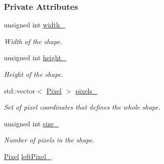 \subsubsection*{Private Attributes}
\begin{CompactItemize}
\item 
\hypertarget{class_shape_863661d529942b525830d2208259583b}{
unsigned int \hyperlink{class_shape_863661d529942b525830d2208259583b}{width\_\-}}
\label{class_shape_863661d529942b525830d2208259583b}

\begin{CompactList}\small\item\em Width of the shape. \item\end{CompactList}\item 
\hypertarget{class_shape_76354eeb3b4c5c6c9125f4195c3c274c}{
unsigned int \hyperlink{class_shape_76354eeb3b4c5c6c9125f4195c3c274c}{height\_\-}}
\label{class_shape_76354eeb3b4c5c6c9125f4195c3c274c}

\begin{CompactList}\small\item\em Height of the shape. \item\end{CompactList}\item 
\hypertarget{class_shape_286ebb0c6010efe288d5e79192e309dc}{
std::vector$<$ \hyperlink{_shape_8hpp_535e59456e3e633842529cfa8ea103c4}{Pixel} $>$ \hyperlink{class_shape_286ebb0c6010efe288d5e79192e309dc}{pixels\_\-}}
\label{class_shape_286ebb0c6010efe288d5e79192e309dc}

\begin{CompactList}\small\item\em Set of pixel coordinates that defines the whole shape. \item\end{CompactList}\item 
\hypertarget{class_shape_adec7080fb17de89d2f6c9d53d4b0283}{
unsigned int \hyperlink{class_shape_adec7080fb17de89d2f6c9d53d4b0283}{size\_\-}}
\label{class_shape_adec7080fb17de89d2f6c9d53d4b0283}

\begin{CompactList}\small\item\em Number of pixels in the shape. \item\end{CompactList}\item 
\hypertarget{class_shape_812cd080959b320038aae54729831ce4}{
\hyperlink{_shape_8hpp_535e59456e3e633842529cfa8ea103c4}{Pixel} \hyperlink{class_shape_812cd080959b320038aae54729831ce4}{leftPixel\_\-}}
\label{class_shape_812cd080959b320038aae54729831ce4}


\end{CompactItemize}
